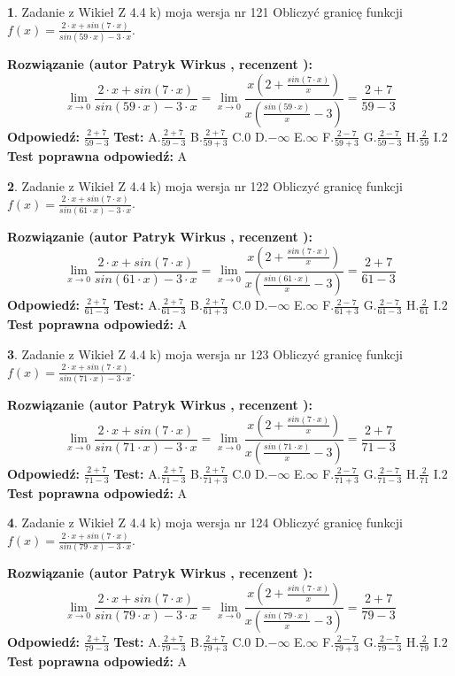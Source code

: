 \documentclass[12pt, a4paper]{article}
\theoremstyle{definition} %
\newtheorem{zad}{}
\newcommand{\zadStart}[1]{\begin{zad}#1\newline}
\newcommand{\zadStop}{\end{zad}}
\newcommand{\rozwStart}[2]{\noindent \textbf{Rozwiązanie (autor #1 , recenzent #2): }\newline}
\newcommand{\rozwStop}{\newline}
\newcommand{\odpStart}{\noindent \textbf{Odpowiedź:}\newline}
\newcommand{\odpStop}{\newline}
\newcommand{\testStart}{\noindent \textbf{Test:}\newline}
\newcommand{\testStop}{\newline}
\newcommand{\kluczStart}{\noindent \textbf{Test poprawna odpowiedź:}\newline}
\newcommand{\kluczStop}{\newline}
\begin{document}
\zadStart{Zadanie z Wikieł Z 4.4 k) moja wersja nr 121}
Obliczyć granicę funkcji $f(x)=\frac{2\cdot x +sin(7\cdot x)}{sin(59\cdot x) -3\cdot x}$.
\zadStop
\rozwStart{Patryk Wirkus}{}
$$\lim\limits_{x\to 0}\frac{2\cdot x +sin(7\cdot x)}{sin(59\cdot x) -3\cdot x}
=\lim\limits_{x\to 0}\frac{x(2+\frac{sin(7\cdot x)}{x})}{x(\frac{sin(59\cdot x)}{x}-3)}
=\frac{2+7}{59-3}$$
\rozwStop
\odpStart
$\frac{2+7}{59-3}$
\odpStop
\testStart
A.$\frac{2+7}{59-3}$
B.$\frac{2+7}{59+3}$
C.$0$
D.$-\infty$
E.$\infty$
F.$\frac{2-7}{59+3}$
G.$\frac{2-7}{59-3}$
H.$\frac{2}{59}$
I.$2$
\testStop
\kluczStart
A
\kluczStop



\zadStart{Zadanie z Wikieł Z 4.4 k) moja wersja nr 122}
Obliczyć granicę funkcji $f(x)=\frac{2\cdot x +sin(7\cdot x)}{sin(61\cdot x) -3\cdot x}$.
\zadStop
\rozwStart{Patryk Wirkus}{}
$$\lim\limits_{x\to 0}\frac{2\cdot x +sin(7\cdot x)}{sin(61\cdot x) -3\cdot x}
=\lim\limits_{x\to 0}\frac{x(2+\frac{sin(7\cdot x)}{x})}{x(\frac{sin(61\cdot x)}{x}-3)}
=\frac{2+7}{61-3}$$
\rozwStop
\odpStart
$\frac{2+7}{61-3}$
\odpStop
\testStart
A.$\frac{2+7}{61-3}$
B.$\frac{2+7}{61+3}$
C.$0$
D.$-\infty$
E.$\infty$
F.$\frac{2-7}{61+3}$
G.$\frac{2-7}{61-3}$
H.$\frac{2}{61}$
I.$2$
\testStop
\kluczStart
A
\kluczStop



\zadStart{Zadanie z Wikieł Z 4.4 k) moja wersja nr 123}
Obliczyć granicę funkcji $f(x)=\frac{2\cdot x +sin(7\cdot x)}{sin(71\cdot x) -3\cdot x}$.
\zadStop
\rozwStart{Patryk Wirkus}{}
$$\lim\limits_{x\to 0}\frac{2\cdot x +sin(7\cdot x)}{sin(71\cdot x) -3\cdot x}
=\lim\limits_{x\to 0}\frac{x(2+\frac{sin(7\cdot x)}{x})}{x(\frac{sin(71\cdot x)}{x}-3)}
=\frac{2+7}{71-3}$$
\rozwStop
\odpStart
$\frac{2+7}{71-3}$
\odpStop
\testStart
A.$\frac{2+7}{71-3}$
B.$\frac{2+7}{71+3}$
C.$0$
D.$-\infty$
E.$\infty$
F.$\frac{2-7}{71+3}$
G.$\frac{2-7}{71-3}$
H.$\frac{2}{71}$
I.$2$
\testStop
\kluczStart
A
\kluczStop



\zadStart{Zadanie z Wikieł Z 4.4 k) moja wersja nr 124}
Obliczyć granicę funkcji $f(x)=\frac{2\cdot x +sin(7\cdot x)}{sin(79\cdot x) -3\cdot x}$.
\zadStop
\rozwStart{Patryk Wirkus}{}
$$\lim\limits_{x\to 0}\frac{2\cdot x +sin(7\cdot x)}{sin(79\cdot x) -3\cdot x}
=\lim\limits_{x\to 0}\frac{x(2+\frac{sin(7\cdot x)}{x})}{x(\frac{sin(79\cdot x)}{x}-3)}
=\frac{2+7}{79-3}$$
\rozwStop
\odpStart
$\frac{2+7}{79-3}$
\odpStop
\testStart
A.$\frac{2+7}{79-3}$
B.$\frac{2+7}{79+3}$
C.$0$
D.$-\infty$
E.$\infty$
F.$\frac{2-7}{79+3}$
G.$\frac{2-7}{79-3}$
H.$\frac{2}{79}$
I.$2$
\testStop
\kluczStart
A
\kluczStop
\end{document}
